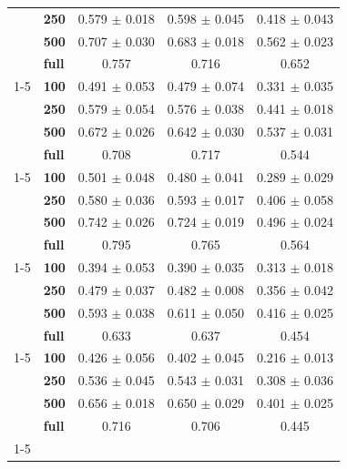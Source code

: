 \begin{table}[t]
\begin{tabular}{llccc}
\textbf{} & \textbf{250} & 0.579 $\pm$ 0.018 & 0.598 $\pm$ 0.045 & 0.418 $\pm$ 0.043 \\
\textbf{} & \textbf{500} & 0.707 $\pm$ 0.030 & 0.683 $\pm$ 0.018 & 0.562 $\pm$ 0.023 \\
\textbf{} & \textbf{full} & 0.757 & 0.716 & 0.652 \\
\cline{1-5}
\multirow[t]{4}{*}{\textbf{chiShona}} & \textbf{100} & 0.491 $\pm$ 0.053 & 0.479 $\pm$ 0.074 & 0.331 $\pm$ 0.035 \\
\textbf{} & \textbf{250} & 0.579 $\pm$ 0.054 & 0.576 $\pm$ 0.038 & 0.441 $\pm$ 0.018 \\
\textbf{} & \textbf{500} & 0.672 $\pm$ 0.026 & 0.642 $\pm$ 0.030 & 0.537 $\pm$ 0.031 \\
\textbf{} & \textbf{full} & 0.708 & 0.717 & 0.544 \\
\cline{1-5}
\multirow[t]{4}{*}{\textbf{Swahili}} & \textbf{100} & 0.501 $\pm$ 0.048 & 0.480 $\pm$ 0.041 & 0.289 $\pm$ 0.029 \\
\textbf{} & \textbf{250} & 0.580 $\pm$ 0.036 & 0.593 $\pm$ 0.017 & 0.406 $\pm$ 0.058 \\
\textbf{} & \textbf{500} & 0.742 $\pm$ 0.026 & 0.724 $\pm$ 0.019 & 0.496 $\pm$ 0.024 \\
\textbf{} & \textbf{full} & 0.795 & 0.765 & 0.564 \\
\cline{1-5}
\multirow[t]{4}{*}{\textbf{Yoruba}} & \textbf{100} & 0.394 $\pm$ 0.053 & 0.390 $\pm$ 0.035 & 0.313 $\pm$ 0.018 \\
\textbf{} & \textbf{250} & 0.479 $\pm$ 0.037 & 0.482 $\pm$ 0.008 & 0.356 $\pm$ 0.042 \\
\textbf{} & \textbf{500} & 0.593 $\pm$ 0.038 & 0.611 $\pm$ 0.050 & 0.416 $\pm$ 0.025 \\
\textbf{} & \textbf{full} & 0.633 & 0.637 & 0.454 \\
\cline{1-5}
\multirow[t]{4}{*}{\textbf{Amharic}} & \textbf{100} & 0.426 $\pm$ 0.056 & 0.402 $\pm$ 0.045 & 0.216 $\pm$ 0.013 \\
\textbf{} & \textbf{250} & 0.536 $\pm$ 0.045 & 0.543 $\pm$ 0.031 & 0.308 $\pm$ 0.036 \\
\textbf{} & \textbf{500} & 0.656 $\pm$ 0.018 & 0.650 $\pm$ 0.029 & 0.401 $\pm$ 0.025 \\
\textbf{} & \textbf{full} & 0.716 & 0.706 & 0.445 \\
\cline{1-5}
\bottomrule
\end{tabular}
\end{table}
